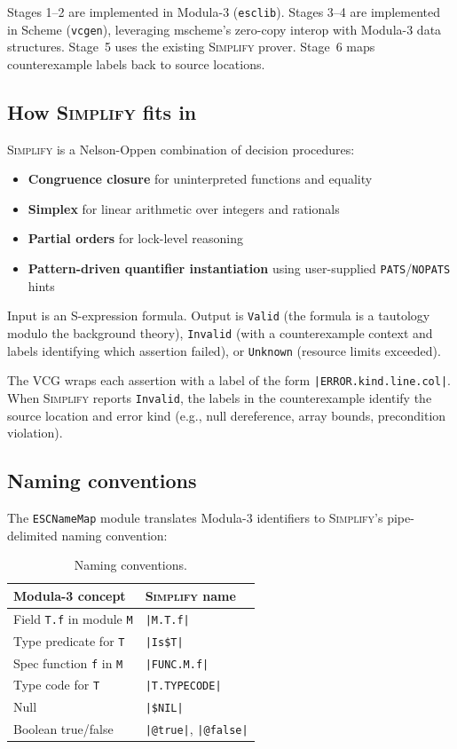 \documentclass[11pt]{article}
\newcommand{\simplify}{\textsc{Simplify}}
\newcommand{\m}[1]{\texttt{#1}}
\begin{document}
Stages 1--2 are implemented in Modula-3 (\m{esclib}).  Stages 3--4
are implemented in Scheme (\m{vcgen}), leveraging mscheme's zero-copy
interop with Modula-3 data structures.  Stage~5 uses the existing
\simplify{} prover.  Stage~6 maps counterexample labels back to
source locations.

\subsection{How \simplify{} fits in}

\simplify{} is a Nelson-Oppen combination of decision procedures:
\begin{itemize}[nosep]
  \item \textbf{Congruence closure} for uninterpreted functions and
    equality
  \item \textbf{Simplex} for linear arithmetic over integers and
    rationals
  \item \textbf{Partial orders} for lock-level reasoning
  \item \textbf{Pattern-driven quantifier instantiation} using
    user-supplied \m{PATS}/\m{NOPATS} hints
\end{itemize}

Input is an S-expression formula.  Output is \m{Valid} (the formula is
a tautology modulo the background theory), \m{Invalid} (with a
counterexample context and labels identifying which assertion failed),
or \m{Unknown} (resource limits exceeded).

The VCG wraps each assertion with a label of the form
\m{|ERROR.kind.line.col|}.  When \simplify{} reports \m{Invalid}, the
labels in the counterexample identify the source location and error
kind (e.g., null dereference, array bounds, precondition violation).

\subsection{Naming conventions}

The \m{ESCNameMap} module translates Modula-3 identifiers to
\simplify{}'s pipe-delimited naming convention:

\begin{table}[ht]
\centering
\begin{tabular}{@{}ll@{}}
\toprule
Modula-3 concept & \simplify{} name \\
\midrule
Field \m{T.f} in module \m{M} & \m{|M.T.f|} \\
Type predicate for \m{T} & \m{|Is\$T|} \\
Spec function \m{f} in \m{M} & \m{|FUNC.M.f|} \\
Type code for \m{T} & \m{|T.TYPECODE|} \\
Null & \m{|\$NIL|} \\
Boolean true/false & \m{|@true|}, \m{|@false|} \\
\bottomrule
\end{tabular}
\caption{Naming conventions.}
\end{table}
\end{document}
